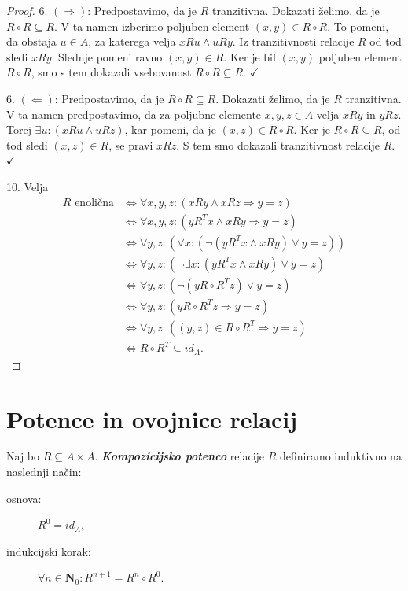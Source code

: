 \documentclass[11pt]{book}
\def\NN{\mathbf{N}}
\def\definicija{\color{rdeca}\bf\em}
\def\kljuka{$\checkmark$}
\theoremstyle{definition}
\theoremstyle{zgled}
\theoremstyle{odprtproblem}
\theoremstyle{domacanaloga}
\newenvironment{dokaz}
    {\color{siva}\begin{proof}}
    {\end{proof}}
\theoremstyle{izrek}
\begin{document}
\begin{dokaz}
6. $(\Rightarrow)$: Predpostavimo, da je $R$ tranzitivna. Dokazati želimo, da je $R \circ R \subseteq R$. V ta namen izberimo poljuben element $(x,y) \in R \circ R$. To pomeni, da obstaja $u \in A$, za katerega velja $xRu \land uRy$. Iz tranzitivnosti relacije $R$ od tod sledi $xRy$. Slednje pomeni ravno $(x,y) \in R$. Ker je bil $(x,y)$ poljuben element $R \circ R$, smo s tem dokazali vsebovanost $R \circ R \subseteq R$. \kljuka

6. $(\Leftarrow)$: Predpostavimo, da je $R \circ R \subseteq R$. Dokazati želimo, da je $R$ tranzitivna. V ta namen predpostavimo, da za poljubne elemente $x,y,z \in A$ velja $xRy$ in $yRz$. Torej $\exists u \colon (xRu \land uRz)$, kar pomeni, da je $(x,z) \in R \circ R$. Ker je $R \circ R \subseteq R$, od tod sledi $(x,z) \in R$, se pravi $xRz$. S tem smo dokazali tranzitivnost relacije $R$. \kljuka

10. Velja 
\begin{align*}
    \text{$R$ enolična} &\Leftrightarrow \forall x,y,z \colon (xRy \land xRz \Rightarrow y=z) \\
    &\Leftrightarrow \forall x,y,z \colon (yR^Tx \land xRy \Rightarrow y = z) \\
    &\Leftrightarrow \forall y,z \colon \left( \forall x \colon (\lnot(yR^Tx \land xRy) \lor y=z) \right) \\
    &\Leftrightarrow \forall y,z \colon \left( \lnot \exists x \colon (yR^Tx \land xRy) \lor y=z \right) \\
    &\Leftrightarrow \forall y,z \colon \left( \lnot (y R \circ R^T z) \lor y = z \right) \\
    &\Leftrightarrow \forall y,z \colon (y R \circ R^T z \Rightarrow y = z) \\
    &\Leftrightarrow \forall y,z \colon \left( (y,z) \in R \circ R^T \Rightarrow y = z \right) \\
    &\Leftrightarrow R \circ R^T \subseteq id_A.
\end{align*}
\end{dokaz}

\section{Potence in ovojnice relacij}

Naj bo $R \subseteq A \times A$. {\definicija Kompozicijsko potenco} relacije $R$ definiramo induktivno na naslednji način:
\begin{description}
    \item[osnova:] $R^0 = id_A$,
    \item[indukcijski korak:] $\forall n \in \NN_0 \colon R^{n+1} = R^n \circ R^0$.
\end{description}
\end{document}
